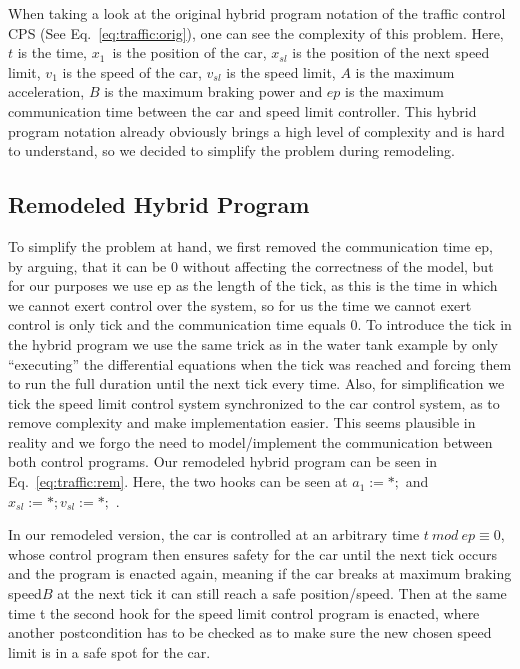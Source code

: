 When taking a look at the original hybrid program notation of the traffic control CPS (See Eq.~\ref{eq:traffic:orig}), one can see the complexity of this problem. Here, \(t\) is the time, \(x_1\)\ is the position of the car, \(x_{sl}\) is the position of the next speed limit, \(v_1\) is the speed of the car, \(v_{sl}\) is the speed limit, \(A\) is the maximum acceleration, \(B\) is the maximum braking power and \(ep\) is the maximum communication time between the car and speed limit controller. This hybrid program notation already obviously brings a high level of complexity and is hard to understand, so we decided to simplify the problem during remodeling. 

\subsection{Remodeled Hybrid Program}
\label{subsec:traffic:remodel}
To simplify the problem at hand, we first removed the communication time ep, by arguing, that it can be 0 without affecting the correctness of the model, but for our purposes we use ep as the length of the tick, as this is the time in which we cannot exert control over the system, so for us the time we cannot exert control is only tick and the communication time equals 0. To introduce the tick in the hybrid program we use the same trick as in the water tank example by only ``executing'' the differential equations when the tick was reached and forcing them to run the full duration until the next tick every time. Also, for simplification we tick the speed limit control system synchronized to the car control system, as to remove complexity and make implementation easier. This seems plausible in reality and we forgo the need to model/implement the communication between both control programs. Our remodeled hybrid program can be seen in Eq.~\ref{eq:traffic:rem}. Here, the two hooks can be seen at \(a_1:=*;\) and \(x_{sl} :=*; v_{sl} := *;\) .

In our remodeled version, the car is controlled at an arbitrary time \(t~mod~ep\equiv0\), whose control program then ensures safety for the car until the next tick occurs and the program is enacted again, meaning if the car breaks at maximum braking speed\( B\) at the next tick it can still reach a safe position/speed. Then at the same time t the second hook for the speed limit control program is enacted, where another postcondition has to be checked as to make sure the new chosen speed limit is in a safe spot for the car.

